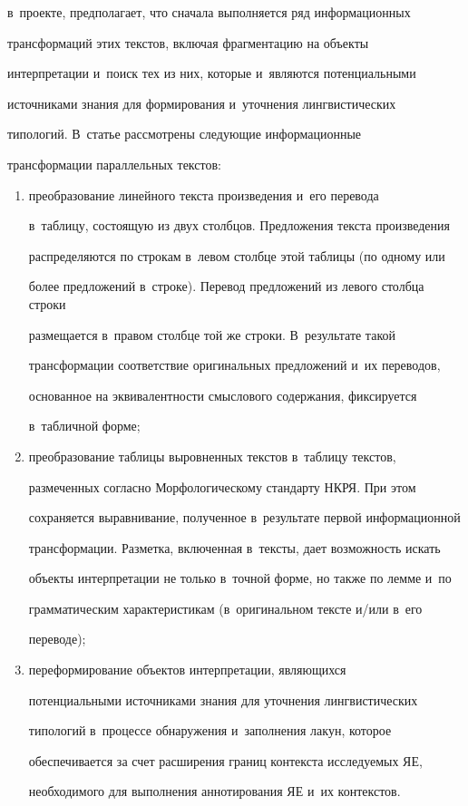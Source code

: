 в~проекте, предполагает, что сначала выполняется ряд информационных 


трансформаций этих текстов, включая фрагментацию на объекты 


интерпретации и~поиск тех из них, которые и~являются потенциальными 


источниками знания для формирования и~уточнения лингвистических 


типологий. В~статье рассмотрены следующие информационные 


трансформации параллельных текстов:


  \begin{enumerate}[(1)]


  \item преобразование линейного текста произведения и~его перевода 


в~таблицу, состоящую из двух столбцов. Предложения текста произведения 


распределяются по строкам в~левом столбце этой таблицы (по одному или 


более предложений в~строке). Перевод предложений из левого столбца строки 


размещается в~правом столбце той же строки. В~результате такой 


трансформации соответствие оригинальных предложений и~их переводов, 


основанное на эквивалентности смыслового содержания, фиксируется 


в~табличной \mbox{форме};


  \item преобразование таблицы выровненных текстов в~таблицу текстов, 


размеченных согласно Морфологическому стандарту НКРЯ. При этом 


сохраняется выравнивание, полученное в~результате первой информационной 


трансформации. Разметка, включенная в~тексты, дает возможность искать 


объекты интерпретации не только в~точной форме, но также по лемме и~по 


грамматическим характеристикам (в~оригинальном тексте и\!/\!или в~его 


переводе);


  \item переформирование объектов интерпретации, являющихся 


потенциальными источниками знания для уточнения лингвистических 


типологий в~процессе обнаружения и~заполнения лакун, которое 


обеспечивается за счет расширения границ контекста исследуемых ЯЕ, 


необходимого для выполнения аннотирования ЯЕ и~их контекстов.


  \end{enumerate}


